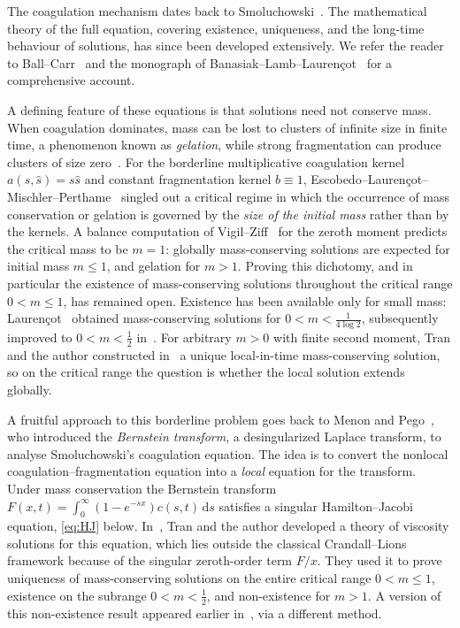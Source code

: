 \documentclass[12pt]{amsart}
\numberwithin{equation}{section}
\theoremstyle{plain}
\theoremstyle{definition}
\newcommand{\dd}{\,\mathrm{d}}
\begin{document}
The coagulation mechanism dates back to
Smoluchowski~\cite{Smoluchowski}. The mathematical theory of the full
equation, covering existence, uniqueness, and the long-time behaviour of
solutions, has since been developed extensively. We refer the reader to
Ball--Carr~\cite{BallCarr} and the monograph of
Banasiak--Lamb--Lauren\c{c}ot~\cite{BLL} for a comprehensive account.

A defining feature of these equations is that solutions need not conserve mass.
When coagulation dominates, mass can be lost to clusters of infinite size in
finite time, a phenomenon known as \emph{gelation}, while strong fragmentation
can produce clusters
of size zero~\cite{EMP,ELMP}. For the borderline multiplicative coagulation
kernel $a(s,\hat s)=s\hat s$ and constant fragmentation kernel $b\equiv1$,
Escobedo--Lauren\c{c}ot--Mischler--Perthame~\cite{ELMP} singled out a critical
regime in which the occurrence of mass conservation or gelation is governed by
the \emph{size of the initial mass} rather than by the kernels. A balance
computation of Vigil--Ziff~\cite{VigilZiff} for the zeroth moment predicts the
critical mass to be $m=1$: globally mass-conserving solutions are expected for
initial mass $m\le1$, and gelation for $m>1$. Proving this dichotomy, and in
particular the existence of mass-conserving solutions throughout the critical
range $0<m\le1$, has remained open. Existence has been available only for small
mass: Lauren\c{c}ot~\cite{Laurencot} obtained mass-conserving solutions for
$0<m<\tfrac{1}{4\log2}$, subsequently improved to $0<m<\tfrac12$ in~\cite{TV}.
For arbitrary $m>0$ with finite second moment, Tran and the author constructed
in~\cite{TVlocal} a unique local-in-time mass-conserving solution, so on the
critical range the question is whether the local solution extends globally.

A fruitful approach to this borderline problem goes back to Menon and
Pego~\cite{MenonPego}, who introduced the \emph{Bernstein transform}, a
desingularized Laplace transform, to analyse Smoluchowski's coagulation
equation. The idea is to convert the nonlocal coagulation--fragmentation
equation into a
\emph{local} equation for the transform. Under mass conservation the Bernstein
transform $F(x,t)=\int_0^\infty(1-e^{-sx})c(s,t)\dd s$ satisfies a singular
Hamilton--Jacobi equation, \eqref{eq:HJ} below. In~\cite{TV}, Tran
and the author
developed a theory of viscosity solutions for this equation, which lies outside
the classical Crandall--Lions framework because of the singular zeroth-order
term $F/x$. They used it to prove uniqueness of mass-conserving solutions on the
entire critical range $0<m\le1$, existence on the subrange $0<m<\tfrac12$, and
non-existence for $m>1$.
A version of this non-existence result appeared earlier in~\cite{BLL}, via a different method.
\end{document}
